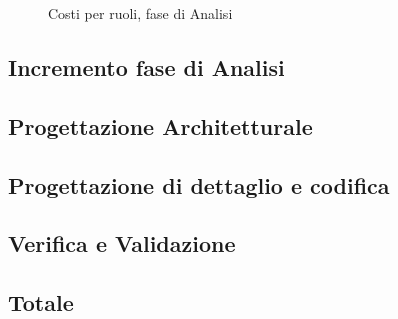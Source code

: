 \begin{figure}[H]
\centering
{}
\caption{Costi per ruoli, fase di Analisi}
\end{figure}
\subsection{Incremento fase di Analisi}
\subsection{Progettazione Architetturale}
\subsection{Progettazione di dettaglio e codifica}
\subsection{Verifica e Validazione}
\subsection{Totale}





